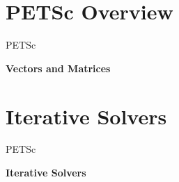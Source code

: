 


\section{PETSc Overview}
\begin{frame}{PETSc}
   \begin{center} \Large \textbf{Vectors and Matrices} \end{center}
\end{frame}





%
%
















%
%

\section{Iterative Solvers}
\begin{frame}{PETSc}
   \begin{center} \Large \textbf{Iterative Solvers} \end{center}
\end{frame}





